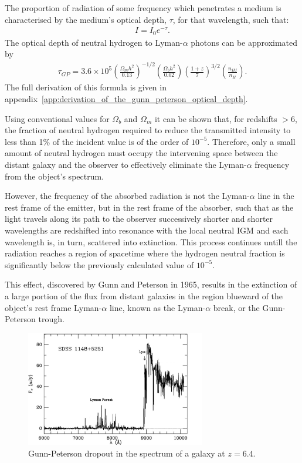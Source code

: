 		The proportion of radiation of some frequency which penetrates a medium is characterised by the medium's optical depth, $\tau$, for that wavelength, such that:
		\begin{align}
			I = I_0 e^{-\tau}. \label{eq:optical_depth}
		\end{align}
		The optical depth of neutral hydrogen to Lyman-$\alpha$ photons can be approximated by
		\begin{align}
			\tau_{GP} = 3.6 \times 10^5	\left ( 	\frac{\Omega_m h^2}{0.13}	\right ) ^{-1/2}
										\left ( 	\frac{\Omega_b h^2}{0.02}	\right )
										\left ( 	\frac{1+z}{7}			\right )^{3/2}
										\left ( 	\frac{n_{HI}}{n_H}			\right ) . \label{eq:gunn-peterson_tau}
		\end{align}
		The full derivation of this formula is given in appendix~\ref{app:derivation_of_the_gunn_peterson_optical_depth}.

		Using conventional values for $\Omega_b$ and $\Omega_m$ it can be shown that, for redshifts $>6$, the fraction of neutral hydrogen required to reduce the transmitted intensity to less than 1\% of the incident value is of the order of $10^{-5}$. Therefore, only a small amount of neutral hydrogen must occupy the intervening space between the distant galaxy and the observer to effectively eliminate the Lyman-$\alpha$ frequency from the object's spectrum.

		However, the frequency  of the absorbed radiation is not the Lyman-$\alpha$ line in the rest frame of the emitter, but in the rest frame of the absorber, such that as the light travels along its path to the observer successively shorter and shorter wavelengths are redshifted into resonance with the local neutral IGM and each wavelength is, in turn, scattered into extinction. This process continues untill the radiation reaches a region of spacetime where the hydrogen neutral fraction is significantly below the previously calculated value of $10^{-5}$.

		This effect, discovered by Gunn and Peterson in 1965, results in the extinction of a large portion of the flux from distant galaxies in the region blueward of the object's rest frame  Lyman-$\alpha$ line, known as the Lyman-$\alpha$ break, or the Gunn-Peterson trough.
		\begin{figure}[htbp]
			\centering
			\includegraphics[width=0.7\textwidth]{../Images/dropout.jpg}
			\caption{Gunn-Peterson dropout in the spectrum of a galaxy at $z=6.4$.}\label{fig:dropout}
		\end{figure}


